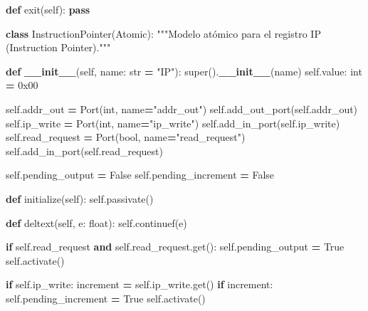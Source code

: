 \documentclass[12pt,oneside]{templates/unerthesis}
\newenvironment{Shaded}{\begin{snugshade}}{\end{snugshade}}
\newcommand{\BaseNTok}[1]{\textcolor[rgb]{0.00,0.00,0.81}{#1}}
\newcommand{\BuiltInTok}[1]{#1}
\newcommand{\ControlFlowTok}[1]{\textcolor[rgb]{0.13,0.29,0.53}{\textbf{#1}}}
\newcommand{\FunctionTok}[1]{\textcolor[rgb]{0.13,0.29,0.53}{\textbf{#1}}}
\newcommand{\KeywordTok}[1]{\textcolor[rgb]{0.13,0.29,0.53}{\textbf{#1}}}
\newcommand{\NormalTok}[1]{#1}
\newcommand{\OperatorTok}[1]{\textcolor[rgb]{0.81,0.36,0.00}{\textbf{#1}}}
\newcommand{\StringTok}[1]{\textcolor[rgb]{0.31,0.60,0.02}{#1}}
\newcommand{\VariableTok}[1]{\textcolor[rgb]{0.00,0.00,0.00}{#1}}
\begin{document}
\begin{Shaded}
\begin{Highlighting}[]
    \KeywordTok{def}\NormalTok{ exit(}\VariableTok{self}\NormalTok{):}
        \ControlFlowTok{pass}


\KeywordTok{class}\NormalTok{ InstructionPointer(Atomic):}
    \StringTok{"""Modelo atómico para el registro IP (Instruction Pointer)."""}
    
    \KeywordTok{def} \FunctionTok{\_\_init\_\_}\NormalTok{(}\VariableTok{self}\NormalTok{, name: }\BuiltInTok{str} \OperatorTok{=} \StringTok{"IP"}\NormalTok{):}
        \BuiltInTok{super}\NormalTok{().}\FunctionTok{\_\_init\_\_}\NormalTok{(name)}
        \VariableTok{self}\NormalTok{.value: }\BuiltInTok{int} \OperatorTok{=} \BaseNTok{0x00}
        
        \VariableTok{self}\NormalTok{.addr\_out }\OperatorTok{=}\NormalTok{ Port(}\BuiltInTok{int}\NormalTok{, name}\OperatorTok{=}\StringTok{"addr\_out"}\NormalTok{)}
        \VariableTok{self}\NormalTok{.add\_out\_port(}\VariableTok{self}\NormalTok{.addr\_out)}
        \VariableTok{self}\NormalTok{.ip\_write }\OperatorTok{=}\NormalTok{ Port(}\BuiltInTok{int}\NormalTok{, name}\OperatorTok{=}\StringTok{"ip\_write"}\NormalTok{)}
        \VariableTok{self}\NormalTok{.add\_in\_port(}\VariableTok{self}\NormalTok{.ip\_write)}
        \VariableTok{self}\NormalTok{.read\_request }\OperatorTok{=}\NormalTok{ Port(}\BuiltInTok{bool}\NormalTok{, name}\OperatorTok{=}\StringTok{"read\_request"}\NormalTok{)}
        \VariableTok{self}\NormalTok{.add\_in\_port(}\VariableTok{self}\NormalTok{.read\_request)}
        
        \VariableTok{self}\NormalTok{.pending\_output }\OperatorTok{=} \VariableTok{False}
        \VariableTok{self}\NormalTok{.pending\_increment }\OperatorTok{=} \VariableTok{False}
    
    \KeywordTok{def}\NormalTok{ initialize(}\VariableTok{self}\NormalTok{):}
        \VariableTok{self}\NormalTok{.passivate()}
    
    \KeywordTok{def}\NormalTok{ deltext(}\VariableTok{self}\NormalTok{, e: }\BuiltInTok{float}\NormalTok{):}
        \VariableTok{self}\NormalTok{.continuef(e)}
        
        \ControlFlowTok{if} \VariableTok{self}\NormalTok{.read\_request }\KeywordTok{and} \VariableTok{self}\NormalTok{.read\_request.get():}
            \VariableTok{self}\NormalTok{.pending\_output }\OperatorTok{=} \VariableTok{True}
            \VariableTok{self}\NormalTok{.activate()}
        
        \ControlFlowTok{if} \VariableTok{self}\NormalTok{.ip\_write:}
\NormalTok{            increment }\OperatorTok{=} \VariableTok{self}\NormalTok{.ip\_write.get()}
            \ControlFlowTok{if}\NormalTok{ increment:}
                \VariableTok{self}\NormalTok{.pending\_increment }\OperatorTok{=} \VariableTok{True}
                \VariableTok{self}\NormalTok{.activate()}
    

\end{Highlighting}
\end{Shaded}
\end{document}
